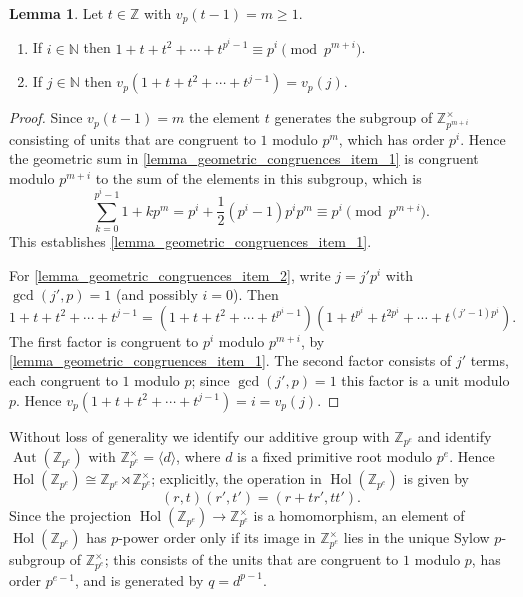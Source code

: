 \documentclass[reqno]{amsart}
\theoremstyle{definition}
\newtheorem{lemma}[theorem]{Lemma}
\newcommand{\Z}{\mathbb{Z}}
\newcommand{\N}{\mathbb{N}}
\DeclareMathOperator{\Hol}{\mbox{Hol}}
\DeclareMathOperator{\Aut}{\mbox{Aut}}
\begin{document}
\begin{lemma} \label{lemma_geometric_congruences}
Let $ t \in \Z $ with $ v_{p}(t-1)=m \geq 1 $. 
\begin{enumerate}
\item If $ i \in \N $ then $ 1 + t + t^{2} +\cdots + t^{p^{i}-1} \equiv p^{i} \pmod{p^{m+i}} $. \label{lemma_geometric_congruences_item_1}
\item If $ j \in \N $ then $ v_{p}(1+t+t^{2}+\cdots + t^{j-1}) = v_{p}(j) $. \label{lemma_geometric_congruences_item_2}
\end{enumerate}
\end{lemma}
\begin{proof}
Since $ v_{p}(t-1)=m $ the element $ t $ generates the subgroup of $ \Z_{p^{m+i}}^{\times} $ consisting of units that are congruent to $ 1 $ modulo $ p^{m} $, which has order $ p^{i} $. Hence the geometric sum in \ref{lemma_geometric_congruences_item_1} is congruent modulo $ p^{m+i} $ to the sum of the elements in this subgroup, which is
\[ \sum_{k=0}^{p^{i}-1} 1 + kp^{m} = p^{i} + \frac{1}{2}(p^{i}-1)p^{i}p^{m} \equiv p^{i} \pmod{p^{m+i}}. \]
This establishes \ref{lemma_geometric_congruences_item_1}. 

For \ref{lemma_geometric_congruences_item_2}, write $ j = j' p^{i} $ with $ \gcd(j',p)=1 $ (and possibly $ i=0 $). Then
\[ 1+t+t^{2}+\cdots + t^{j-1} = (1+t+t^{2}+\cdots + t^{p^{i}-1})(1+t^{p^{i}}+t^{2p^{i}}+\cdots + t^{(j'-1)p^{i}}). \]
The first factor is congruent to $ p^{i} $ modulo $ p^{m+i} $, by \ref{lemma_geometric_congruences_item_1}. The second factor consists of $ j' $ terms, each congruent to $ 1 $ modulo $ p $; since $ \gcd(j',p)=1 $ this factor is a unit modulo $ p $. Hence $ v_{p}(1+t+t^{2}+\cdots + t^{j-1}) = i = v_{p}(j) $. 
\end{proof}

Without loss of generality we identify our additive group with $ \Z_{p^{e}} $ and identify $ \Aut(\Z_{p^{e}}) $ with $ \Z_{p^{e}}^{\times} = \langle d \rangle $, where $ d $ is a fixed primitive root modulo $ p^{e} $. Hence $ \Hol(\Z_{p^{e}}) \cong \Z_{p^{e}} \rtimes \Z_{p^{e}}^{\times} $; explicitly, the operation in $ \Hol(\Z_{p^{e}}) $ is given by 
\[ (r,t)(r',t') = (r + tr', tt'). \]
Since the projection $ \Hol(\Z_{p^{e}}) \rightarrow \Z_{p^{e}}^{\times} $ is a homomorphism, an element of $ \Hol(\Z_{p^{e}})  $ has $ p $-power order only if its image in $ \Z_{p^{e}}^{\times} $ lies in the unique Sylow $ p $-subgroup of $ \Z_{p^{e}}^{\times} $; this consists of the units that are congruent to $ 1 $ modulo $ p $, has order $ p^{e-1} $, and is generated by $ q = d^{p-1} $.
\end{document}
